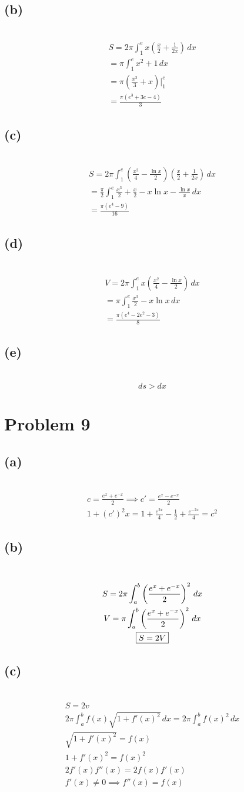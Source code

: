 \documentclass[12pt]{article}
\newcommand*{\paren}[1]{\ensuremath\left(#1\right)}
\newcommand{\at}{\Big|}
\newcommand{\problem}[1]{\section{Problem #1}}
\newcommand{\subproblem}[1]{\subsection{(#1)} \,}
\begin{document}
\subproblem{b}
\begin{gather*}
    S=2\pi \int_1^e x(\frac{x}{2}+\frac{1}{2x})\, dx\\
    = \pi \int_1^e x^2+1\, dx\\
    = \pi (\frac{x^3}{3}+x)\at_1^e\\
    = \boxed{\frac{\pi(e^3+3e-4)}{3}}
\end{gather*}

\subproblem{c}
\begin{gather*}
    S=2\pi \int_1^e (\frac{x^2}{4}-\frac{\ln x}{2})(\frac{x}{2}+\frac{1}{2x})\, dx\\
    = \frac{\pi}{2} \int_1^e \frac{x^3}{2}+\frac{x}{2}-x\ln x-\frac{\ln x}{x}\, dx\\
    =\boxed{\frac{\pi(e^4-9)}{16}}
\end{gather*}

\subproblem{d}
\begin{gather*}
    V = 2\pi \int_1^e x(\frac{x^2}{4}-\frac{\ln x}{2}) \, dx\\
    = \pi  \int_1^e \frac{x^3}{2}- x\ln x \, dx\\
    =\boxed{\frac{\pi (e^4-2e^2-3)}{8}}
\end{gather*}

\subproblem{e}
\[
ds>dx
\]

\problem{9}

\subproblem{a}
\begin{gather*}
    c=\frac{e^x+e^{-x}}{2} \implies c'=\frac{e^x-e^{-x}}{2}\\
    1+(c')^2 x = 1+\frac{e^{2x}}{4} -\frac{1}{2} + \frac{e^{-2x}}{4}= c^2
\end{gather*}

\subproblem{b}
\begin{gather*}
    S= 2\pi \int_a^b \paren{\frac{e^x+e^{-x}}{2}}^2 \, dx\\
    V= \pi \int_a^b\paren{\frac{e^x+e^{-x}}{2}}^2 \, dx\\
    \boxed{S=2V}
\end{gather*}

\subproblem{c}
\begin{gather*}
    S=2v\\
    2\pi \int_{a}^{b} f(x)\sqrt{1 + f'(x)^2} \, dx = 2\pi \int_{a}^{b} f(x)^2 \, dx\\
    \sqrt{1 + f'(x)^2}=f(x)\\
    \boxed{1 + f'(x)^2=f(x)^2}\\
    2f'(x) f''(x)=2f(x)f'(x)\\
    f'(x) \ne 0 \implies \boxed{f''(x)=f(x)}
\end{gather*}
\end{document}
